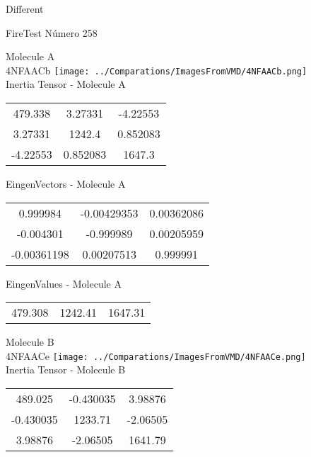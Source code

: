 \begin{center}
\vtab
\vtab
\textcolor{NavyBlue}{\Large Different}
\end{center}

 \newpage

\vtab[-2cm]
\begin{center}
{\large FireTest \tab Número 258}
\end{center}
\begin{multicols}{2}
\begin{center}

Molecule A \\ 
4NFAACb
\texttt{[image: ../Comparations/ImagesFromVMD/4NFAACb.png]}
\\
Inertia Tensor - Molecule A \\
\vtab

\begin{tabular}{|c c c|}
479.338	 & 	3.27331	 & 	-4.22553	 \\
3.27331	 & 	1242.4	 & 	0.852083	 \\
-4.22553	 & 	0.852083	 & 	1647.3
\end{tabular}

\vtab
 EingenVectors - Molecule A     \\
\vtab
\begin{tabular}{|c c c|}
0.999984	 & 	-0.00429353	 & 	0.00362086	 \\
-0.004301	 & 	-0.999989	 & 	0.00205959	 \\
-0.00361198	 & 	0.00207513	 & 	0.999991
\end{tabular}

\vtab
 EingenValues - Molecule A     \\
\vtab
\begin{tabular}{|c c c|}
479.308	 & 	1242.41	 & 	1647.31	 \\
\end{tabular}
\columnbreak

Molecule B \\ 
4NFAACe
\texttt{[image: ../Comparations/ImagesFromVMD/4NFAACe.png]}
\\
Inertia Tensor - Molecule B \\
\vtab

\begin{tabular}{|c c c|}
489.025	 & 	-0.430035	 & 	3.98876	 \\
-0.430035	 & 	1233.71	 & 	-2.06505	 \\
3.98876	 & 	-2.06505	 & 	1641.79
\end{tabular}


\end{center}
\end{multicols}
